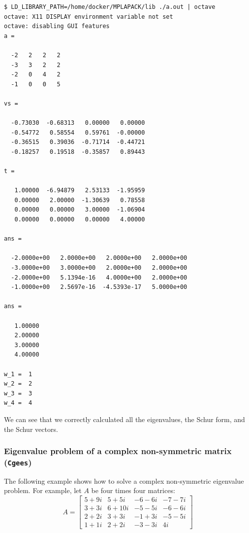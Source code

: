 \documentclass[12pt]{article}
\begin{document}
{\footnotesize
\begin{verbatim}
$ LD_LIBRARY_PATH=/home/docker/MPLAPACK/lib ./a.out | octave
octave: X11 DISPLAY environment variable not set
octave: disabling GUI features
a =

  -2   2   2   2
  -3   3   2   2
  -2   0   4   2
  -1   0   0   5

vs =

  -0.73030  -0.68313   0.00000   0.00000
  -0.54772   0.58554   0.59761  -0.00000
  -0.36515   0.39036  -0.71714  -0.44721
  -0.18257   0.19518  -0.35857   0.89443

t =

   1.00000  -6.94879   2.53133  -1.95959
   0.00000   2.00000  -1.30639   0.78558
   0.00000   0.00000   3.00000  -1.06904
   0.00000   0.00000   0.00000   4.00000

ans =

  -2.0000e+00   2.0000e+00   2.0000e+00   2.0000e+00
  -3.0000e+00   3.0000e+00   2.0000e+00   2.0000e+00
  -2.0000e+00   5.1394e-16   4.0000e+00   2.0000e+00
  -1.0000e+00   2.5697e-16  -4.5393e-17   5.0000e+00

ans =

   1.00000
   2.00000
   3.00000
   4.00000

w_1 =  1
w_2 =  2
w_3 =  3
w_4 =  4
\end{verbatim} }
We can see that we correctly calculated all the eigenvalues, the Schur form, and the Schur vectors.
\subsubsection{Eigenvalue problem of a complex non-symmetric matrix ({\tt Cgees})}

The following example shows how to solve a complex non-symmetric eigenvalue problem. For example, let $A$ be four times four matrices:
\[
A = \left[\begin{array}{cccc}
5+9 i & 5+5 i & -6-6 i & -7-7 i \\
3+3 i & 6+10 i & -5-5 i & -6-6 i \\
2+2 i & 3+3 i & -1+3 i & -5-5 i \\
1+1 i & 2+2 i & -3-3 i & 4 i
\end{array}\right]
\]
\end{document}

